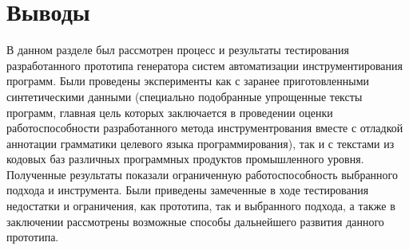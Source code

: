 \section{Выводы}

В данном разделе был рассмотрен процесс и результаты тестирования разработанного прототипа генератора систем автоматизации инструментирования программ.
Были проведены эксперименты как с заранее приготовленными синтетическими данными (специально подобранные упрощенные тексты программ, главная цель которых заключается в проведении оценки работоспособности разработанного метода инструментрования вместе с отладкой аннотации грамматики целевого языка программирования), так и с текстами из кодовых баз различных программных продуктов промышленного уровня.
Полученные результаты показали ограниченную работоспособность выбранного подхода и инструмента.
Были приведены замеченные в ходе тестирования недостатки и ограничения, как прототипа, так и выбранного подхода, а также в заключении рассмотрены возможные способы дальнейшего развития данного прототипа.
